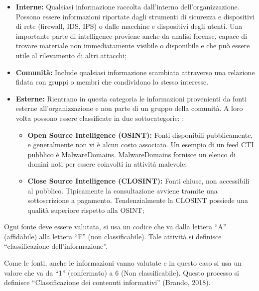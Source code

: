 \begin{itemize}
    \item\textbf{Interne:} Qualsiasi informazione raccolta dall’interno dell’organizzazione. Possono essere informazioni riportate dagli strumenti di sicurezza e dispositivi di rete (firewall, IDS, IPS) o dalle macchine e dispositivi degli utenti. Una importante parte di intelligence proviene anche da analisi forense, capace di trovare materiale non immediatamente visibile o disponibile e che può essere utile al rilevamento di altri attacchi;
    \item\textbf{Comunità:} Include qualsiasi informazione scambiata attraverso una relazione fidata con gruppi o membri che condividono lo stesso interesse. 
    \item\textbf{Esterne:} Rientrano in questa categoria le informazioni provenienti da fonti esterne all'organizzazione e non parte di un gruppo della comunità.
    A loro volta possono essere classificate in due sottocategorie:
:
        \begin{itemize}
            \item\textbf{Open Source Intelligence (OSINT):} Fonti disponibili pubblicamente, e generalmente non vi è alcun costo associato. Un esempio di un feed CTI pubblico è MalwareDomains. MalwareDomains fornisce un elenco di domini noti per essere coinvolti in attività malevole;
            \item\textbf{Close Source Intelligence (CLOSINT):} Fonti chiuse, non accessibili al pubblico. Tipicamente la consultazione avviene tramite una sottoscrizione a pagamento. Tendenzialmente la CLOSINT possiede una qualità superiore rispetto alla OSINT;
        \end{itemize} 
\end{itemize}

Ogni fonte deve essere valutata, si usa un codice che va dalla lettera “A” (affidabile) alla lettera “F” (non classificabile). Tale attività si definisce “classificazione dell’informazione”.\par
Come le fonti, anche le informazioni vanno valutate e in questo caso si usa un valore che va da “1” (confermato) a 6 (Non classificabile). Questo processo si definisce “Classificazione dei contenuti informativi” (Brando, 2018).

\newpage

